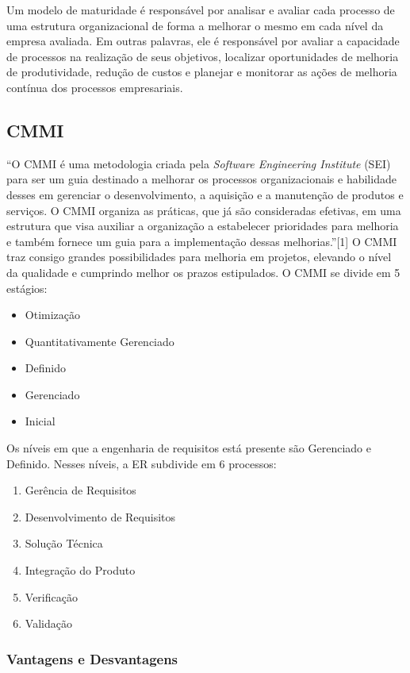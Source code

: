 Um modelo de maturidade é responsável por analisar e avaliar cada processo de uma estrutura organizacional de forma a melhorar o mesmo em cada nível da empresa avaliada. Em outras palavras, ele é responsável por avaliar a capacidade de processos na realização de seus objetivos, localizar oportunidades de melhoria de produtividade, redução de custos e planejar e monitorar as ações de melhoria contínua dos processos empresariais.

\subsection{CMMI}

“O CMMI é uma metodologia criada pela \textit{Software Engineering Institute} (SEI) para ser um guia destinado a melhorar os processos organizacionais e habilidade desses em gerenciar o desenvolvimento, a aquisição e a manutenção de produtos e serviços. O CMMI organiza as práticas, que já são consideradas efetivas, em uma estrutura que visa auxiliar a organização a estabelecer prioridades para melhoria e também fornece um guia para a implementação dessas melhorias.”[1]
O CMMI traz consigo grandes possibilidades para melhoria em projetos, elevando o nível da qualidade e cumprindo melhor os prazos estipulados.
O CMMI se divide em 5 estágios:

\begin{itemize}
\item Otimização
\item Quantitativamente Gerenciado
\item Definido
\item Gerenciado
\item Inicial
\end{itemize}

Os níveis em que a engenharia de requisitos está presente são Gerenciado e Definido. Nesses níveis, a ER subdivide em 6 processos:

\begin{enumerate}
\item Gerência de Requisitos
\item Desenvolvimento de Requisitos
\item Solução Técnica
\item Integração do Produto
\item Verificação
\item Validação
\end{enumerate}

\subsubsection{Vantagens e Desvantagens}

